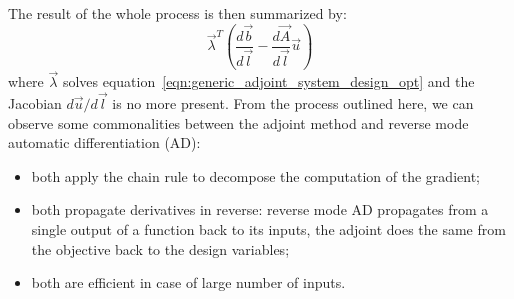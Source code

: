 \bigskip
The result of the whole process is then summarized by:
\begin{equation}
	\label{eqn:resulting_term_adjoint_method}
	\vec{\lambda}^T \left( \frac{d\vec{b}}{d\vec{l}} - \frac{d\vec{A}}{d\vec{l}}\vec{u} \right)
\end{equation}
where $\vec{\lambda}$ solves equation~\eqref{eqn:generic_adjoint_system_design_opt} and the Jacobian $d\vec{u} / d\vec{l}$ is no more present. From the process outlined here, we can observe some commonalities between the adjoint method and reverse mode automatic differentiation (AD):
\begin{itemize}
	\item both apply the chain rule to decompose the computation of the gradient;
	\item both propagate derivatives in reverse: reverse mode AD propagates from a single output of a function back to its inputs, the adjoint does the same from the objective back to the design variables;
	\item both are efficient in case of large number of inputs.
\end{itemize}
